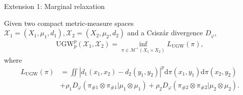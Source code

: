 \documentclass{beamer}
\newcommand{\ugw}{\text{UGW}}
\newcommand{\cX}{\mathcal X}
\newcommand{\cM}{\mathcal M}
\newcommand{\rmd}{\mathrm{d}}
\begin{document}
\begin{frame}{Extension 1: Marginal relaxation}
  \vspace{-0.5cm}
  \scriptsize
  \begin{definition}
    Given two compact metric-measure spaces $\cX_1 = (X_1, \mu_1, d_1),
    \cX_2 = (X_2, \mu_2, d_2)$ and a Csiszár divergence $D_{\varphi}$,
    \begin{align*}
      \ugw_p^p(\cX_1, \cX_2) = \inf_{\pi \in \cM^+(X_1 \times X_2)} L_{\ugw}(\pi),
    \end{align*}
    \vspace{-0.3cm}
    where
    \begin{align*}
      L_{\ugw}(\pi) &= \iint \left| d_1(x_1, x_2) - d_2(y_1, y_2) \right|^p
      \rmd\pi(x_1, y_1) \rmd\pi(x_2, y_2) \\
      &+ \rho_1 D_{\varphi}(\pi_{\# 1} \otimes \pi_{\# 1} | \mu_1 \otimes \mu_1)
      + \rho_2 D_{\varphi}(\pi_{\# 2} \otimes \pi_{\# 2} | \mu_2 \otimes \mu_2).
    \end{align*}
  \end{definition}

  \vspace{-0.5cm}


\end{frame}
\end{document}
